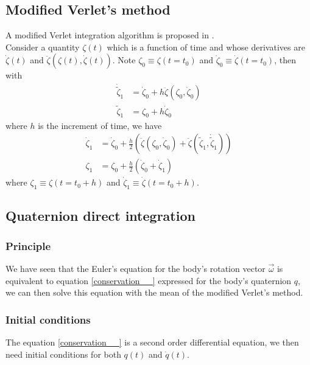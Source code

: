 \documentclass[class=report, float=false, crop=false]{standalone}
\begin{document}
\subsection{Modified Verlet's method}
\label{Verlet_princ}

A modified Verlet integration algorithm is proposed in \cite{vaagberg2017shear}.\\

Consider a quantity $\zeta(t)$ which is a function of time and whose derivatives are $\dot{\zeta}(t)$ and $\ddot{\zeta}(\zeta(t),\dot{\zeta}(t))$. Note $\zeta_0 \equiv \zeta(t = t_0)$ and $\dot{\zeta}_0 \equiv \dot{\zeta}(t = t_0)$, then with
\begin{align*}
\dot{\tilde{\zeta}}_1 &= \dot{\zeta}_0 + h\ddot{\zeta}(\zeta_0,\dot{\zeta}_0)\\
\tilde{\zeta}_1 &= \zeta_0 + h\dot{\zeta}_0
\end{align*}
where $h$ is the increment of time, we have
\begin{align*}
\dot{\zeta}_1 &= \dot{\zeta}_0 + \frac{h}{2}(\ddot{\zeta}(\zeta_0,\dot{\zeta}_0) + \ddot{\zeta}(\tilde{\zeta}_1,\dot{\tilde{\zeta}}_1))
\\
\zeta_1 &= \zeta_0 + \frac{h}{2}(\dot{\zeta}_0 + \dot{\zeta}_1)
\end{align*}
where $\zeta_1 \equiv \zeta(t = t_0 + h)$ and $\dot{\zeta}_1 \equiv \dot{\zeta}(t = t_0 + h)$.

\subsection{Quaternion direct integration}
\label{quaternion_d_int}

\subsubsection{Principle}

We have seen that the Euler's equation for the body's rotation vector $\vec{\omega}$ is equivalent to equation \ref{conservation__} expressed for the body's quaternion $q$, we can then solve this equation with the mean of the modified Verlet's method.

\subsubsection{Initial conditions}
\label{quat_init}

The equation \ref{conservation__} is a second order differential equation, we then need initial conditions for both $q(t)$ and $\dot{q}(t)$.\\
\end{document}
